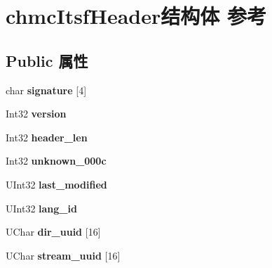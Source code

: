 \hypertarget{structchmc_itsf_header}{}\section{chmc\+Itsf\+Header结构体 参考}
\label{structchmc_itsf_header}
\subsection*{Public 属性}
\begin{DoxyCompactItemize}
\item 
\mbox{\label{structchmc_itsf_header_a9742b5a1e0dc085c81239ebab19e509e}} 
char {\bfseries signature} \mbox{[}4\mbox{]}
\item 
\mbox{\label{structchmc_itsf_header_a2914c062ccff59e5f390afdf8f21da3e}} 
Int32 {\bfseries version}
\item 
\mbox{\label{structchmc_itsf_header_ae6f64e7744d09e11c9ba56f95a300ba5}} 
Int32 {\bfseries header\+\_\+len}
\item 
\mbox{\label{structchmc_itsf_header_a260fc841f7349b0543f1e0a597150728}} 
Int32 {\bfseries unknown\+\_\+000c}
\item 
\mbox{\label{structchmc_itsf_header_aa4758db94c404a30530dae488afdab9e}} 
U\+Int32 {\bfseries last\+\_\+modified}
\item 
\mbox{\label{structchmc_itsf_header_aad2b57169d882580c0271b0a1552c476}} 
U\+Int32 {\bfseries lang\+\_\+id}
\item 
\mbox{\label{structchmc_itsf_header_a9a6fa37807c1b1b32dab87025a3d9d14}} 
U\+Char {\bfseries dir\+\_\+uuid} \mbox{[}16\mbox{]}
\item 
\mbox{\label{structchmc_itsf_header_a6fede3247dc6dccc26527873e782d72d}} 
U\+Char {\bfseries stream\+\_\+uuid} \mbox{[}16\mbox{]}
\item 
\mbox{\label{structchmc_itsf_header_a323c16cc4069d64790f73e7cc51e5089}} 

\end{DoxyCompactItemize}
